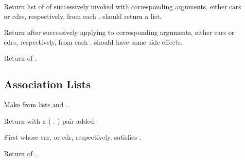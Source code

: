 \begin{LIST}{1cm}
  {
  Return list of 
   of
   successively invoked with corresponding arguments,
  either cars or cdrs, respectively,
  from each .  should return a list.
  }

  {
  Return  after successively applying
   to corresponding arguments, either cars or cdrs,
  respectively, from each .  should have some side
  effects. 
  }

  {
  Return  of .
  }

\end{LIST}


\subsection{Association Lists} 
\label{section:Association Lists}
\begin{LIST}{1cm}

  {
  Make  from lists  and .
  }

  {
  Return  with a ( . ) pair added.
  }

  {
  First  whose car, or cdr, respectively, satisfies .
  }

  {
  Return  of .
  }

\end{LIST}


